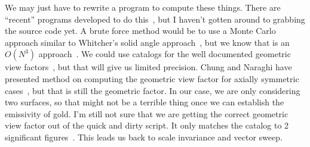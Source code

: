 We may just have to rewrite a program to compute these things.  There
are ``recent'' programs developed to do
this~\cite{walton_calculation_2002}, but I haven't gotten around to
grabbing the source code yet.  A brute force method would be to use a
Monte Carlo approach similar to Whitcher's solid angle
approach~\cite{whitcher_monte_2012}, but we know that is an \(O(N^3)\)
approach~\cite{walton_calculation_2002}.  We could use catalogs for the
well documented geometric view factors~\cite{howell_catalog_2010}, but
that will give us limited precision.  Chung and Naraghi have presented
method on computing the geometric view factor for axially symmetric
cases~\cite{chung_simpler_1982, naraghi_radiation_1982,
chung_formulation_1984}, but that is still the geometric factor.  In our
case, we are only considering two surfaces, so that might not be a
terrible thing once we can establish the emissivity of gold.  I'm still
not sure that we are getting the correct geometric view factor out of
the quick and dirty script.  It only matches the catalog to 2
significant figures~\cite{howell_catalog_2010}.  This leads us back to
scale invariance and vector sweep.

